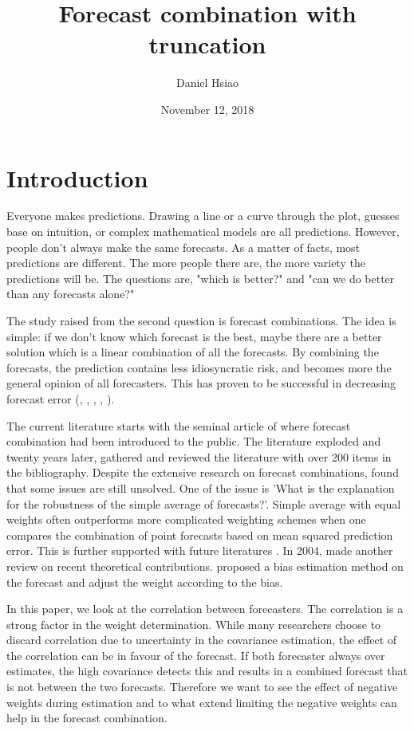 \documentclass[11pt]{article}
\title{Forecast combination with truncation}
\author{Daniel Hsiao}
\date{November 12, 2018}
\begin{document}
\maketitle
\newpage
{
\setcounter{tocdepth}{3}
\tableofcontents
}
\newpage

\section{Introduction}\label{introduction}
Everyone makes predictions. Drawing a line or a curve through the plot, guesses base on intuition, or complex mathematical models are all predictions. However, people don't always make the same forecasts. As a matter of facts, most predictions are different. The more people there are, the more variety the predictions will be. The questions are, "which is better?" and "can we do better than any forecasts alone?"

The study raised from the second question is forecast combinations. The idea is simple: if we don't know which forecast is the best, maybe there are a better solution which is a linear combination of all the forecasts. By combining the forecasts, the prediction contains less idiosyncratic risk, and becomes more the general opinion of all forecasters. This has proven to be successful in decreasing forecast error (\cite{Clemen1989}, \cite{Diebold1996}, \cite{Chen1999} , \cite{Dunis2000}, \cite{Stock2004}).

The current literature starts with the seminal article of \cite{Bates1969} where forecast combination had been introduced to the public. The literature exploded and twenty years later, \cite{Clemen1989} gathered and reviewed the literature with over 200 items in the bibliography. Despite the extensive research on forecast combinations, \citeauthor{Clemen1989} found that some issues are still unsolved. One of the issue is 'What is the explanation for the robustness of the simple average of forecasts?'. Simple average with equal weights often outperforms more complicated weighting schemes when one compares the combination of point forecasts based on mean squared prediction error. This is further supported with future literatures \citep{Stock2004}. In 2004, \citeauthor{Elliot2004} made another review on recent theoretical contributions. \cite{Gibbs2017} proposed a bias estimation method on the forecast and adjust the weight according to the bias.

In this paper, we look at the correlation between forecasters. The correlation is a strong factor in the weight determination. While many researchers choose to discard correlation due to uncertainty in the covariance estimation, the effect of the correlation can be in favour of the forecast. If both forecaster always over estimates, the high covariance detects this and results in a combined forecast that is not between the two forecasts. Therefore we want to see the effect of negative weights during estimation and to what extend limiting the negative weights can help in the forecast combination.
\end{document}
